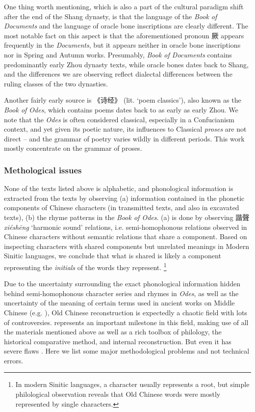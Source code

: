 \documentclass[UTF8, a4paper, oneside, scheme=plain, 12pt]{ctexrep}
\newcommand{\form}[1]{\emph{#1}}
\newcommand{\work}[1]{\textit{#1}}
\newcommand{\translate}[1]{`#1'}
\begin{document}
One thing worth mentioning, which is also a part of the cultural paradigm shift after the end of the Shang dynasty, is that 
the language of the \work{Book of Documents} and the language of oracle bone inscriptions are clearly different.
The most notable fact on this aspect is that
the aforementioned pronoun 厥 appears frequently in the \work{Documents},
but it appears neither in oracle bone inscriptions nor in Spring and Autumn works. 
Presumably, \work{Book of Documents} contains predominantly early Zhou dynasty texts,
while oracle bones dates back to Shang,
and the differences we are observing reflect dialectal differences between the ruling classes of the two dynasties.

Another fairly early source is 《诗经》 (lit. \translate{poem classics}),
also known as the \work{Book of Odes},
which contains poems dates back to as early as early Zhou.
We note that the \work{Odes} is often considered classical, especially in a Confucianism context,
and yet given its poetic nature, its influences to Classical \emph{proses} are not direct
-- and the grammar of poetry varies wildly in different periods.
This work mostly concentrate on the grammar of proses.

\subsubsection{Methological issues}\label{sec:intro.prehistory.reconstruction.problems}

None of the texts listed above is alphabetic,
and phonological information is extracted from the texts by observing
(a) information contained in the phonetic components of Chinese characters
(in transmitted texts, and also in excavated texts),
(b) the rhyme patterns in the \work{Book of Odes}.
(a) is done by observing 諧聲 \form{xiéshēng} \translate{harmonic sound} relations,
i.e. semi-homophonous relations observed in Chinese characters without semantic relations that share a component.
Based on inspecting characters with shared components but unrelated meanings in Modern Sinitic languages,
we conclude that what is shared is likely a component representing the \emph{initials} of the words they represent.%
\footnote{
    In modern Sinitic languages, a character usually represents a root,
    but simple philological observation reveals that Old Chinese words were mostly represented by single characters.
}

Due to the uncertainty surrounding the exact phonological information
hidden behind semi-homophonous character series and rhymes in \work{Odes},
as well as the uncertainty of the meaning of certain terms used in 
ancient works on Middle Chinese (e.g. ),
Old Chinese reconstruction is expectedly a chaotic field with lots of controversies.
\citet{baxter2014old} represents an important milestone in this field,
making use of all the materials mentioned above as well as
a rich toolbox of philology, the historical comparative method, and internal reconstruction.
But even it has severe flaws \citep{harbsmeier2016irrefutable}.
Here we list some major methodological problems and not technical errors.
\end{document}
